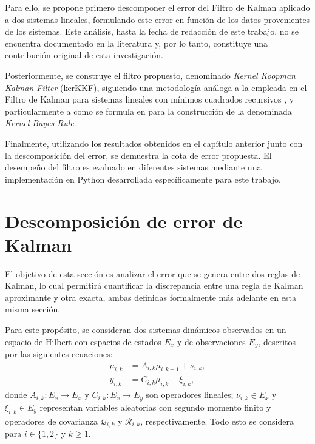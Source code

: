 Para ello, se propone primero descomponer el error del Filtro de Kalman aplicado a dos sistemas lineales, formulando este error en función de los datos provenientes de los sistemas. Este análisis, hasta la fecha de redacción de este trabajo, no se encuentra documentado en la literatura y, por lo tanto, constituye una contribución original de esta investigación.

Posteriormente, se construye el filtro propuesto, denominado \textit{Kernel Koopman Kalman Filter} (kerKKF), siguiendo una metodología análoga a la empleada en el Filtro de Kalman para sistemas lineales con mínimos cuadrados recursivos \cite{Kalman1960AProblems, Triantafyllopoulos2021BayesianBeyond}, y particularmente a como se formula en \cite{Gebhard2019} para la construcción de la denominada \textit{Kernel Bayes Rule}.

Finalmente, utilizando los resultados obtenidos en el capítulo anterior junto con la descomposición del error, se demuestra la cota de error propuesta. El desempeño del filtro es evaluado en diferentes sistemas mediante una implementación en Python desarrollada específicamente para este trabajo.

\section{Descomposición de error de Kalman}

El objetivo de esta sección es analizar el error que se genera entre dos reglas de Kalman, lo cual permitirá cuantificar la discrepancia entre una regla de Kalman aproximante y otra exacta, ambas definidas formalmente más adelante en esta misma sección. 

Para este propósito, se consideran dos sistemas dinámicos observados en un espacio de Hilbert con espacios de estados $E_x$ y de observaciones $E_y$, descritos por las siguientes ecuaciones:  
\begin{equation*}
	\begin{aligned}
		\mu_{i,k}  &= A_{i,k} \mu_{i,k-1} + \nu_{i,k}, \\
		y_{i,k} &= C_{i,k} \mu_{i,k} + \xi_{i,k},
	\end{aligned}
\end{equation*}
donde $A_{i,k} : E_x \to E_x$ y $C_{i,k}: E_x \to E_y$ son operadores lineales; $\nu_{i,k} \in E_x$ y $\xi_{i,k} \in E_y$ representan variables aleatorias con segundo momento finito y operadores de covarianza $\mathcal{Q}_{i,k}$ y $\mathcal{R}_{i,k}$, respectivamente. Todo esto se considera para $i \in \{1,2\}$ y $k \geq 1$.


